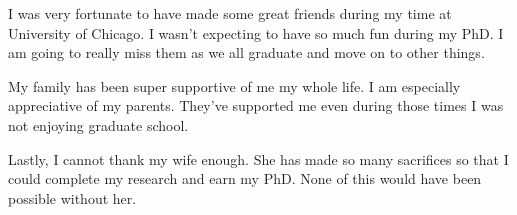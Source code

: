 I was very fortunate to have made some great friends during my time at
University of Chicago. I wasn't expecting to have so much fun during
my PhD. I am going to really miss them as we all graduate and move on
to other things.

My family has been super supportive of me my whole life. I am
especially appreciative of my parents. They've supported me even
during those times I was not enjoying graduate school.

Lastly, I cannot thank my wife enough. She has made so many sacrifices
so that I could complete my research and earn my PhD. None of this
would have been possible without her.

